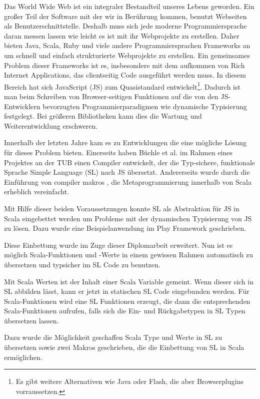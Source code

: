 \documentclass[12pt,bibtotoc]{scrreprt}
\begin{document}
Das World Wide Web ist ein integraler Bestandteil unseres Lebens geworden. Ein großer Teil der Software mit der wir in Berührung kommen, benutzt Webseiten als Benutzerschnittstelle. Deshalb muss sich jede moderne Programmiersprache daran messen lassen wie leicht es ist mit ihr Webprojekte zu erstellen. Daher bieten Java, Scala, Ruby und viele andere Programmiersprachen Frameworks an um schnell und einfach strukturierte Webprojekte zu erstellen. Ein gemeinsames Problem dieser Frameworks ist es, insbesondere mit dem aufkommen von Rich Internet Applications, das clientseitig Code ausgeführt werden muss. In diesem Bereich hat sich JavaScript (JS) zum Quasistandard entwickelt\footnote{Es gibt weitere Alternativen wie Java oder Flash, die aber Browserplugins vorraussetzen.}. Dadurch ist man beim Schreiben von Browser-seitigen Funktionen auf die von den JS-Entwicklern bevorzugten Programmierparadigmen wie dynamische Typisierung festgelegt. Bei größeren Bibliotheken kann dies die Wartung und Weiterentwicklung erschweren.

Innerhalb der letzten Jahre kam es zu Entwicklungen die eine mögliche Lösung für dieses Problem bieten. Einerseits haben Büchle et al. im Rahmen eines Projektes an der \ac{TUB} einen Compiler entwickelt, der die Typ-sichere, funktionale Sprache Simple Language (SL) nach JS übersetzt\cite{Buchle2013}. Andererseits wurde durch die Einführung von compiler makros \cite{Burmako2013}, die Metaprogrammierung innerhalb von Scala erheblich vereinfacht.

Mit Hilfe dieser beiden Voraussetzungen konnte SL als Abstraktion für JS in Scala eingebettet werden\cite{Hoger2013} um Probleme mit der dynamischen Typisierung von JS zu lösen. Dazu wurde eine Beispielanwendung im Play Framework geschrieben\cite{Play1}. 

Diese Einbettung wurde im Zuge dieser Diplomarbeit erweitert. Nun ist es  möglich Scala-Funktionen und -Werte in einem gewissen Rahmen automatisch zu übersetzen und typsicher im SL Code zu benutzen. 

Mit Scala Werten ist der Inhalt einer Scala Variable gemeint. Wenn dieser sich in SL abbilden lässt, kann er jetzt in statischen SL Code eingebunden werden. Für Scala-Funktionen wird eine SL Funktionen erzeugt, die dann die entsprechenden Scala-Funktionen aufrufen, falls sich die Ein- und Rückgabetypen in SL Typen übersetzen lassen.

Dazu wurde die Möglichkeit geschaffen Scala Type und Werte in SL zu übersetzen sowie zwei Makros geschrieben, die die Einbettung von SL in Scala ermöglichen. 
\end{document}
